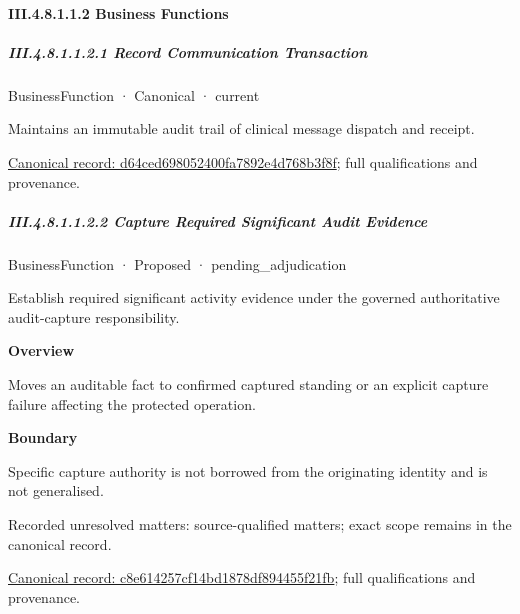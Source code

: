 \paragraph*{III.4.8.1.1.2 Business Functions}
\label{navigation:III.4.8.1.1.2}

\subparagraph*{III.4.8.1.1.2.1 Record Communication Transaction}
\label{navigation:III.4.8.1.1.2.1}

\label{element:d64ced698052400fa7892e4d768b3f8f}
{\small BusinessFunction · Canonical · current}\par

Maintains an immutable audit trail of clinical message dispatch and receipt.


{\footnotesize \href{../../../../../../../../continuum/business/business-function/d64ced698052400fa7892e4d768b3f8f.md}{Canonical record: d64ced698052400fa7892e4d768b3f8f}; full qualifications and provenance.}\par
\subparagraph*{III.4.8.1.1.2.2 Capture Required Significant Audit Evidence}
\label{navigation:III.4.8.1.1.2.2}

\label{element:c8e614257cf14bd1878df894455f21fb}
{\small BusinessFunction · Proposed · pending\_adjudication}\par

Establish required significant activity evidence under the governed authoritative audit-capture responsibility.



\textbf{Overview}



Moves an auditable fact to confirmed captured standing or an explicit capture failure affecting the protected operation.



\textbf{Boundary}



Specific capture authority is not borrowed from the originating identity and is not generalised.


{\small Recorded unresolved matters: source-qualified matters; exact scope remains in the canonical record.}\par
{\footnotesize \href{../../../../../../../../continuum/business/business-function/c8e614257cf14bd1878df894455f21fb.md}{Canonical record: c8e614257cf14bd1878df894455f21fb}; full qualifications and provenance.}\par
